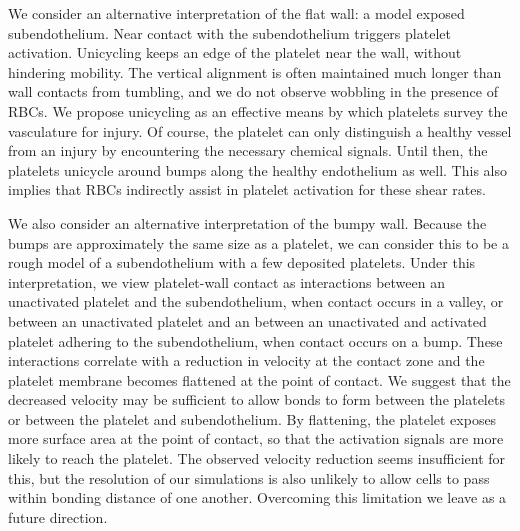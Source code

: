 We consider an alternative interpretation of the flat wall: a model exposed
subendothelium. Near contact with the subendothelium triggers platelet activation.
Unicycling keeps an edge of the platelet near the wall, without hindering mobility. The
vertical alignment is often maintained much longer than wall contacts from tumbling, and
we do not observe wobbling in the presence of RBCs. We propose unicycling as an effective
means by which platelets survey the vasculature for injury. Of course, the platelet can
only distinguish a healthy vessel from an injury by encountering the necessary chemical
signals. Until then, the platelets unicycle around bumps along the healthy endothelium as
well. This also implies that RBCs indirectly assist in platelet activation for these
shear rates.

We also consider an alternative interpretation of the bumpy wall. Because the bumps are
approximately the same size as a platelet, we can consider this to be a rough model of
a subendothelium with a few deposited platelets. Under this interpretation, we view
platelet-wall contact as interactions between an unactivated platelet and the
subendothelium, when contact occurs in a valley, or between an unactivated platelet and
an between an unactivated and activated platelet adhering to the subendothelium, when
contact occurs on a bump.  These interactions correlate with a reduction in velocity at
the contact zone and the platelet membrane becomes flattened at the point of contact. We
suggest that the decreased velocity may be sufficient to allow bonds to form between the
platelets or between the platelet and subendothelium. By flattening, the platelet exposes
more surface area at the point of contact, so that the activation signals are more likely
to reach the platelet. The observed velocity reduction seems insufficient for this, but
the resolution of our simulations is also unlikely to allow cells to pass within bonding
distance of one another. Overcoming this limitation we leave as a future direction.
